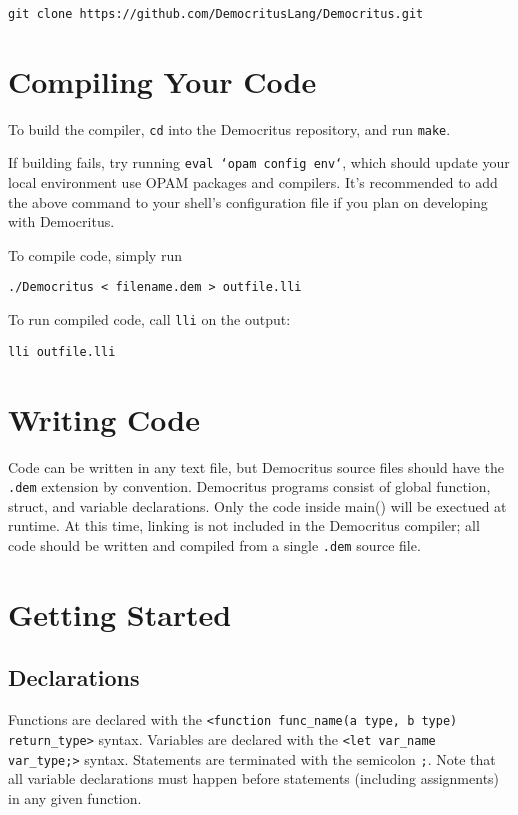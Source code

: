 	\begin{lstlisting}
git clone https://github.com/DemocritusLang/Democritus.git
	\end{lstlisting}


\section{Compiling Your Code}
	
	To build the compiler, \texttt{cd} into the Democritus repository, and run \texttt{make}.

	\medskip \noindent
	If building fails, try running \texttt{eval `opam config env`}, which should update your local environment use OPAM packages and compilers. It's recommended to add the above command to your shell's configuration file if you plan on developing with Democritus.

	\medskip \noindent
	To compile code, simply run
	\begin{lstlisting}
./Democritus < filename.dem > outfile.lli
	\end{lstlisting}

	\noindent To run compiled code, call \texttt{lli} on the output:
	\begin{lstlisting}
lli outfile.lli
	\end{lstlisting}

\section{Writing Code}

	Code can be written in any text file, but Democritus source files should have the \texttt{.dem} extension by convention. Democritus programs consist of global function, struct, and variable declarations. Only the code inside main() will be exectued at runtime. At this time, linking is not included in the Democritus compiler; all code should be written and compiled from a single \texttt{.dem} source file.

\section{Getting Started}

	\subsection{Declarations}
	Functions are declared with the \texttt{<function func\_name(a type, b type) return\_type>} syntax. Variables are declared with the \texttt{<let var\_name var\_type;>} syntax. Statements are terminated with the semicolon \texttt{;}. Note that all variable declarations must happen before statements (including assignments) in any given function.

